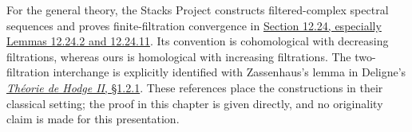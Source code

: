 For the general theory, the Stacks Project constructs filtered-complex
spectral sequences and proves finite-filtration convergence in
\href{https://stacks.math.columbia.edu/tag/012K}{Section 12.24,
especially Lemmas 12.24.2 and 12.24.11}. Its convention is cohomological
with decreasing filtrations, whereas ours is homological with increasing
filtrations. The two-filtration interchange is explicitly identified
with Zassenhaus's lemma in Deligne's
\href{https://www.numdam.org/item/10.1007/BF02684692.pdf}{\emph{Th\'eorie
de Hodge II}, \S1.2.1}. These references place the constructions in their
classical setting; the proof in this chapter is given directly, and no
originality claim is made for this presentation.
